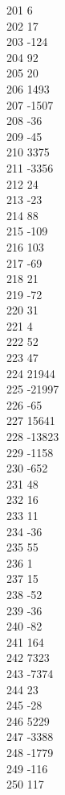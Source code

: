 { 201	6 \\
 202	17 \\
 203	-124 \\
 204	92 \\
 205	20 \\
 206	1493 \\
 207	-1507 \\
 208	-36 \\
 209	-45 \\
 210	3375 \\
 211	-3356 \\
 212	24 \\
 213	-23 \\
 214	88 \\
 215	-109 \\
 216	103 \\
 217	-69 \\
 218	21 \\
 219	-72 \\
 220	31 \\
 221	4 \\
 222	52 \\
 223	47 \\
 224	21944 \\
 225	-21997 \\
 226	-65 \\
 227	15641 \\
 228	-13823 \\
 229	-1158 \\
 230	-652 \\
 231	48 \\
 232	16 \\
 233	11 \\
 234	-36 \\
 235	55 \\
 236	1 \\
 237	15 \\
 238	-52 \\
 239	-36 \\
 240	-82 \\
 241	164 \\
 242	7323 \\
 243	-7374 \\
 244	23 \\
 245	-28 \\
 246	5229 \\
 247	-3388 \\
 248	-1779 \\
 249	-116 \\
 250	117 \\
}
